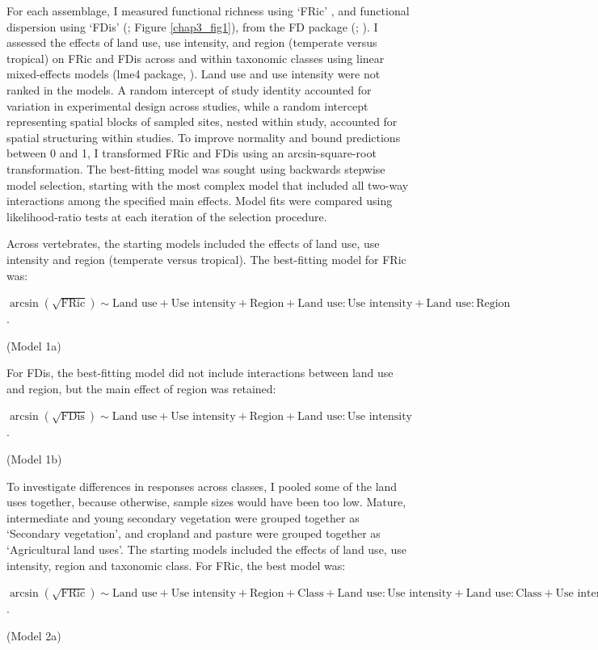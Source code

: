 For each assemblage, I measured functional richness using `FRic' \citep{Villeger2008}, and functional dispersion using `FDis’ (\citet{Laliberte2010}; Figure \ref{chap3_fig1}), from the FD package (\citet{Laliberte2010}; \citet{Laliberte2015}). I assessed the effects of land use, use intensity, and region (temperate versus tropical) on FRic and FDis across and within taxonomic classes using linear mixed-effects models (lme4 package, \citet{Bates2015}). Land use and use intensity were not ranked in the models. A random intercept of study identity accounted for variation in experimental design across studies, while a random intercept representing spatial blocks of sampled sites, nested within study, accounted for spatial structuring within studies. To improve normality and bound predictions between 0 and 1, I transformed FRic and FDis using an arcsin-square-root transformation. The best-fitting model was sought using backwards stepwise model selection, starting with the most complex model that included all two-way interactions among the specified main effects. Model fits were compared using likelihood-ratio tests at each iteration of the selection procedure.

Across vertebrates, the starting models included the effects of land use, use intensity and region (temperate versus tropical). The best-fitting model for FRic was:
\begin{center}
$\arcsin(\sqrt{\text{FRic}})\sim \text{Land use} + \text{Use intensity} + \text{Region} + \text{Land use}:\text{Use intensity} + \text{Land use}:\text{Region}$.\\
\end{center}
\hspace*{\fill}(Model 1a)

For FDis, the best-fitting model did not include interactions between land use and region, but the main effect of region was retained:
\begin{center}
$\arcsin(\sqrt{\text{FDis}})\sim \text{Land use} + \text{Use intensity} + \text{Region} + \text{Land use}:\text{Use intensity}$.\\
\end{center}
\hspace*{\fill}(Model 1b)

To investigate differences in responses across classes, I pooled some of the land uses together, because otherwise, sample sizes would have been too low. Mature, intermediate and young secondary vegetation were grouped together as `Secondary vegetation', and cropland and pasture were grouped together as `Agricultural land uses'. The starting models included the effects of land use, use intensity, region and taxonomic class. For FRic, the best model was:
\begin{center}
$\arcsin(\sqrt{\text{FRic}})\sim \text{Land use} + \text{Use intensity} + \text{Region} + \text{Class} + \text{Land use}:\text{Use intensity} + \text{Land use}:\text{Class} + \text{Use intensity}:\text{Region} + \text{Class}:\text{Region}$.\\
\end{center}
\hspace*{\fill}(Model 2a)


